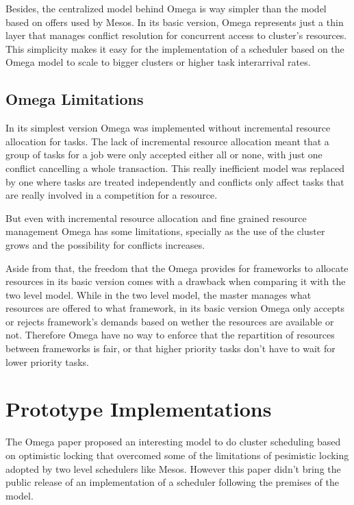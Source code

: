 \documentclass{report}                     %
\begin{document}
Besides, the centralized model behind Omega is way simpler than the
model based on offers used by Mesos. In its basic version, Omega
represents just a thin layer that manages conflict resolution for
concurrent access to cluster's resources. This simplicity makes it
easy for the implementation of a scheduler based on the Omega model to
scale to bigger clusters or higher task interarrival rates.

\section{Omega Limitations}

In its simplest version Omega was implemented without incremental
resource allocation for tasks.  The lack of incremental resource
allocation meant that a group of tasks for a job were only accepted
either all or none, with just one conflict cancelling a whole
transaction. This really inefficient model was replaced by one where
tasks are treated independently and conflicts only affect tasks that
are really involved in a competition for a resource.

But even with incremental resource allocation and fine grained
resource management Omega has some limitations, specially as the
use of the cluster grows and the possibility for conflicts
increases. 

Aside from that, the freedom that the Omega provides for frameworks to
allocate resources in its basic version comes with a drawback when
comparing it with the two level model. While in the two level model,
the master manages what resources are offered to what framework, in
its basic version Omega only accepts or rejects framework's demands
based on wether the resources are available or not.  Therefore Omega
have no way to enforce that the repartition of resources between
frameworks is fair, or that higher priority tasks don't have to wait
for lower priority tasks.

\chapter{Prototype Implementations}
\label{sec:implementation}

The Omega paper proposed an interesting model to do cluster
scheduling based on optimistic locking that overcomed some of the
limitations of pesimistic locking adopted by two level schedulers like
Mesos. However this paper didn't bring the public release of an
implementation of a scheduler following the premises of the
model. 
\end{document}

